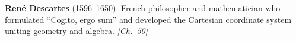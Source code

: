 \textbf{René Descartes} (1596–1650). French philosopher and mathematician who formulated ``Cogito, ergo sum'' and developed the Cartesian coordinate system uniting geometry and algebra. \emph{[Ch.~\hyperref[ch:consciousness]{50}]}

